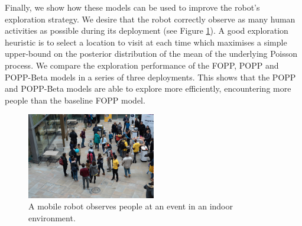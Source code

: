 Finally, we show how these models can be used to improve the robot's exploration strategy. We desire that the robot correctly observe as many human activities as possible during its deployment (see Figure \ref{fig:robot_in_human_environment}). A good exploration heuristic is to select a location to visit at each time which maximises a simple upper-bound on the posterior distribution of the mean of the underlying Poisson process. We compare the exploration performance of the FOPP, POPP and POPP-Beta models in a series of three deployments. This shows that the POPP and POPP-Beta models are able to explore more efficiently, encountering more people than the baseline FOPP model.

\begin{figure}[t!]
	\centering
	\includegraphics[width=0.5\textwidth]{./figures/robot_in_human_environment.jpeg}
	\caption{A mobile robot observes people at an event in an indoor environment.} 
	\label{fig:robot_in_human_environment}
\end{figure}

% 

